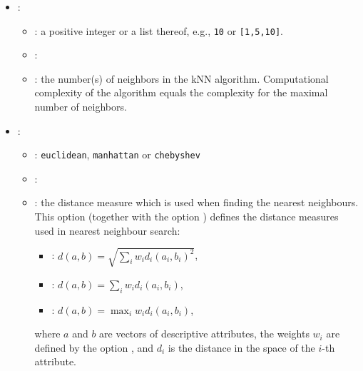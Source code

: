 \begin{itemize}
    \item {}:
    \begin{itemize}
        \item \optionPossibleValues{}: a positive integer or a list thereof, e.g., \texttt{10} or \texttt{[1,5,10]}.
        \item \optionDefaultValue{}: \optionDefaultValueStyle{[1,3]}
        \item \optionDescrption{}: the number(s) of neighbors in the kNN algorithm. Computational complexity of the algorithm equals
        the complexity for the maximal number of neighbors.
    \end{itemize}
    \item {}:
    \begin{itemize}
        \item \optionPossibleValues{}: \texttt{euclidean}, \texttt{manhattan} or \texttt{chebyshev}
        \item \optionDefaultValue{}: 
        \item \optionDescrption{}: the distance measure which is used when finding the nearest neighbours.        
        This option (together with the option ) defines the distance measures used in nearest neighbour search:
        \begin{itemize}
            \item {}: $d(a, b) = \sqrt{\sum_i w_i d_i(a_i, b_i)^2}$,
            \item {}: $d(a, b) = \sum_i w_i d_i(a_i, b_i)$,
            \item {}: $d(a, b) = \max_i w_i d_i(a_i, b_i)$,
        \end{itemize}
        where $a$ and $b$ are vectors of descriptive attributes, the weights $w_i$ are defined by the option ,
        and $d_i$ is the distance in the space of the $i$-th attribute.
        

\end{itemize}
\end{itemize}
